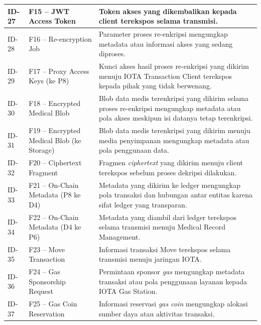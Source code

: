 \begin{xltabular}{\textwidth}{|>{\centering\arraybackslash}p{1.8cm}|>{\raggedright\arraybackslash}p{3.2cm}|X|}
    ID-27 &
    F15 -- JWT Access Token &
    Token akses yang dikembalikan kepada client terekspos selama transmisi. \\
    \hline

    ID-28 &
    F16 -- Re-encryption Job &
    Parameter proses re-enkripsi mengungkap metadata atau informasi akses yang sedang diproses. \\
    \hline

    ID-29 &
    F17 -- Proxy Access Keys (ke P8) &
    Kunci akses hasil proses re-enkripsi yang dikirim menuju IOTA Transaction Client terekspos kepada pihak yang tidak berwenang. \\
    \hline

    ID-30 &
    F18 -- Encrypted Medical Blob &
    Blob data medis terenkripsi yang dikirim selama proses re-enkripsi mengungkap metadata atau pola akses meskipun isi datanya tetap terenkripsi. \\
    \hline

    ID-31 &
    F19 -- Encrypted Medical Blob (ke Storage) &
    Blob data medis terenkripsi yang dikirim menuju media penyimpanan mengungkap metadata atau pola penggunaan data. \\
    \hline

    ID-32 &
    F20 -- Ciphertext Fragment &
    Fragmen \textit{ciphertext} yang dikirim menuju client terekspos sebelum proses dekripsi dilakukan. \\
    \hline

    ID-33 &
    F21 -- On-Chain Metadata (P8 ke D4) &
    Metadata yang dikirim ke ledger mengungkap pola transaksi dan hubungan antar entitas karena sifat ledger yang transparan. \\
    \hline

    ID-34 &
    F22 -- On-Chain Metadata (D4 ke P6) &
    Metadata yang diambil dari ledger terekspos selama transmisi menuju Medical Record Management. \\
    \hline

    ID-35 &
    F23 -- Move Transaction &
    Informasi transaksi Move terekspos selama transmisi menuju jaringan IOTA. \\
    \hline

    ID-36 &
    F24 -- Gas Sponsorship Request &
    Permintaan sponsor \textit{gas} mengungkap metadata transaksi atau pola penggunaan layanan kepada IOTA Gas Station. \\
    \hline

    ID-37 &
    F25 -- Gas Coin Reservation &
    Informasi reservasi \textit{gas coin} mengungkap alokasi sumber daya atau aktivitas transaksi. \\
    \hline


\end{xltabular}

